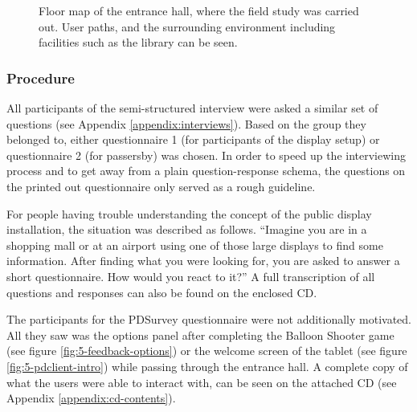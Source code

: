 		\begin{figure}%
		    \begin{center}
		    \end{center}
			 \caption[Floor Map of Entrance Hall]{Floor map of the entrance hall, where the field study was carried out. User paths, and the surrounding environment including facilities such as the library can be seen.}
			 \label{fig:5-entrance-hall}
		\end{figure}




	\subsubsection{Procedure}

		All participants of the semi-structured interview were asked a similar set of questions (see Appendix \ref{appendix:interviews}). Based on the group they belonged to, either questionnaire 1 (for participants of the display setup) or questionnaire 2 (for passersby) was chosen. In order to speed up the interviewing process and to get away from a plain question-response schema, the questions on the printed out questionnaire only served as a rough guideline. 

		For people having trouble understanding the concept of the public display installation, the situation was described as follows. ``Imagine you are in a shopping mall or at an airport using one of those large displays to find some information. After finding what you were looking for, you are asked to answer a short questionnaire. How would you react to it?'' A full transcription of all questions and responses can also be found on the enclosed CD. 

		The participants for the PDSurvey questionnaire were not additionally motivated. All they saw was the options panel after completing the Balloon Shooter game (see figure \ref{fig:5-feedback-options}) or the welcome screen of the tablet (see figure \ref{fig:5-pdclient-intro}) while passing through the entrance hall. A complete copy of what the users were able to interact with, can be seen on the attached CD (see Appendix \ref{appendix:cd-contents}).







